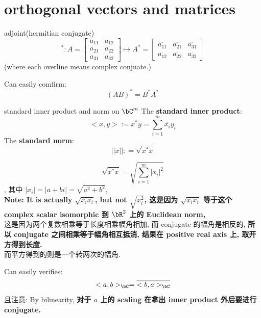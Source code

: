 \chapter{orthogonal vectors and matrices}

\begin{definition}{adjoint(hermitian conjugate)}
\[
    ^*:
    A = \begin{bmatrix} a_{11} & a_{12} \\ a_{21} & a_{22}   \\a_{31} & a_{32}  \end{bmatrix}
    \mapsto A^* =  \begin{bmatrix} \overline{a_{11}} & \overline{a_{21}}  &\overline{a_{31}} \\ \overline{a_{12}} & \overline{a_{22}} & \overline{a_{32}}   \end{bmatrix}
    \]
(where each overline means complex conjuate.)
\end{definition}
\begin{remark}
    Can easily comfirm:
    $$
    (AB)^* = B^* A^*
    $$
\end{remark}



\begin{definition}{standard inner product and norm on $\bC^m$}
The \textbf{standard inner product}:
$$
<x,y> := x^* y  = \sum_{i=1}^m \overline{x_i} y_i
$$
The \textbf{standard norm}:
$$
||x|| : =  \sqrt{x^* x}
$$
\end{definition}
\begin{remark}
$$
\sqrt{x^* x} = \sqrt{\sum_{i=1}^m |x_i|^2}
$$, 其中 $|x_i| = |a+ bi| = \sqrt{a^2 + b^2}$, \\
\textbf{Note: It is actually $\sqrt{\overline{x_i} x_i}$, but not $\sqrt{x_i^2}$, 这是因为 $\sqrt{\overline{x_i} x_i}$ 等于这个 complex scalar isomorphic 到 $\bR^2$ 上的 Euclidean norm,}\\ 
这是因为两个复数相乘等于长度相乘幅角相加, 而 conjugate 的幅角是相反的, \textbf{所以 conjugate 之间相乘等于幅角相互抵消, 结果在 positive real axis 上, 取开方得到长度.} \\
而平方得到的则是一个转两次的幅角.
\end{remark}
\begin{remark}
    Can easily verifies:
    $$
    <a,b>_{\bC} = \overline{<b,a>_{\bC}}
    $$
    且注意: By bilinearity, \textbf{对于 $a$ 上的 scaling 在拿出 inner product 外后要进行 conjugate.}
\end{remark}

